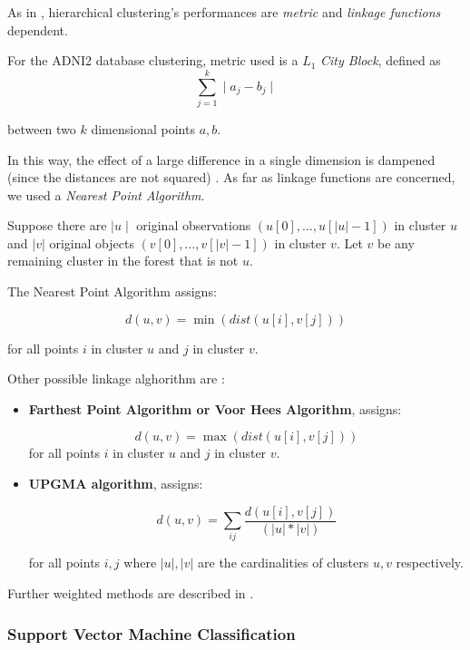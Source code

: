 \documentclass[12pt,openright,twoside,a4paper]{book}
\begin{document}
As in \cite{cluster2}, hierarchical clustering's performances are \textit{metric} and \textit{linkage functions} dependent.

For the ADNI2 database clustering, metric used is a $L_1$ \textit{City Block}, defined as 
\begin{equation}
\sum_{j=1}^k \mid a_j - b_j \mid 
\label{mcl}
\end{equation}

between two $k$ dimensional points $a,b$. 

In this way, the effect of a large difference in a single dimension is dampened (since the distances are not squared) \cite{cluster}.
As far as linkage functions are concerned, we used a \textit{Nearest Point Algorithm}. 

Suppose there are $\mid u\mid$ original observations $(u[0],..., u[|u|-1])$ in cluster $u$ and $|v|$ original objects $(v[0], \ldots, v[|v|-1])$ in cluster $v$. Let $v$ be any remaining cluster in the forest that is not $u$.

The Nearest Point Algorithm assigns:

\begin{equation}
d(u,v) = \min(dist(u[i],v[j]))
\end{equation}

for all points $i$ in cluster $u$ and $j$ in cluster $v$.

Other possible linkage alghorithm are \cite{cluster2}:
\begin{itemize}
\item \textbf{Farthest Point Algorithm or Voor Hees Algorithm}, assigns:

\begin{equation}
d(u, v) = \max(dist(u[i],v[j]))
\end{equation}
for all points $i$ in cluster $u$ and $j$ in cluster $v$.

\item \textbf{UPGMA algorithm}, assigns:

\begin{equation}
d(u,v) = \sum_{ij} \frac{d(u[i], v[j])}{(|u|*|v|)}
\end{equation}

for all points $i,j$ where $|u|,|v|$ are the cardinalities of clusters $u,v$ respectively.

\end{itemize}

Further weighted methods are described in \cite{cluster2}.

\subsubsection*{Support Vector Machine Classification}
\end{document}
